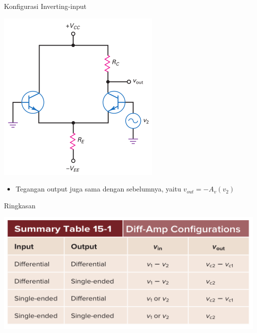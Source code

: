 \documentclass[aspectratio=169]{beamer}
\begin{document}
\begin{frame}{Konfigurasi Inverting-input}
	\begin{multicols}{2}
		\begin{center}
			\includegraphics[height=0.7\textheight]{gambar/01.inverting_input+single-ended_output}
		\end{center}
		\columnbreak
		\begin{itemize}
			\item Tegangan output juga sama dengan sebelumnya, yaitu $ v_{out} = -A_v(v_2) $
		\end{itemize}
	\end{multicols}
\end{frame}

\begin{frame}{Ringkasan}
	\begin{center}
		\includegraphics[height=0.6\textheight]{gambar/01.ringkasan_dif-amp-conf}
	\end{center}
\end{frame}
\end{document}
